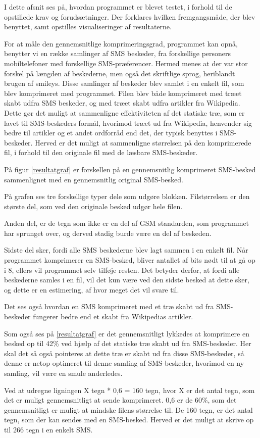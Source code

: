I dette afsnit ses på, hvordan programmet er blevet testet, i forhold til de opstillede krav og 
forudsætninger. Der forklares hvilken fremgangsmåde, der blev benyttet, samt opstilles visualiseringer af 
resultaterne.

For at måle den gennemsnitlige komprimeringsgrad, programmet kan opnå, benytter vi en række samlinger 
af SMS beskeder, fra forskellige personers mobiltelefoner med forskellige SMS-præferencer. Hermed menes at der 
var stor forskel på længden af beskederne, men også det skriftlige sprog, heriblandt brugen af 
smileys.
Disse samlinger af beskeder blev samlet i en enkelt fil, som blev komprimeret med programmet.
Filen blev både komprimeret med træet skabt udfra SMS beskeder, og med træet skabt udfra 
artikler fra Wikipedia. Dette gør det muligt at sammenligne effektiviteten af det statiske træ, som 
er lavet til SMS-beskeders formål, hvorimod træet ud fra Wikipedia, henvender sig bedre til artikler og et 
andet ordforråd end det, der typisk benyttes i SMS-beskeder.
Herved er det muligt at sammenligne størrelsen på den komprimerede fil, i forhold til den originale fil 
med de læsbare SMS-beskeder.

På figur \ref{resultatgraf} er forskellen på en gennemsnitlig komprimeret SMS-besked sammenlignet med en 
gennemsnitlig original SMS-besked.

På grafen ses tre forskellige typer dele som udgøre blokken. Filstørrelsen er den største del, som ved den 
originale besked udgør hele filen.

Anden del, er de tegn som ikke er en del af GSM standarden, som programmet har sprunget over, og derved 
stadig burde være en del af beskeden.

Sidste del sker, fordi alle SMS beskederne blev lagt sammen i en enkelt fil. Når programmet komprimerer en SMS-besked, bliver 
antallet af bits nødt til at gå op i 8, ellers vil programmet selv tilføje resten. Det betyder derfor, at 
fordi alle beskederne samles i en fil, vil det kun være ved den sidste besked at dette sker, og dette er 
en estimering, af hvor meget det vil svare til.

Det ses også hvordan en SMS komprimeret med et træ skabt ud fra SMS-beskeder fungerer bedre end et skabt 
fra Wikipedias artikler.



Som også ses på \ref{resultatgraf} er det gennemsnitligt lykkedes at komprimere en besked op til 42\% ved 
hjælp af det statiske træ skabt ud fra SMS-beskeder.
Her skal det så også pointeres at dette træ er skabt ud fra disse SMS-beskeder, så denne er netop optimeret 
til denne samling af SMS-beskeder, hvorimod en ny samling, vil være en smule anderledes.

Ved at udregne ligningen X tegn * 0,6 = 160 tegn, hvor X er det antal tegn, som det er muligt 
gennemsnitligt at sende komprimeret. 0,6 er de 60\%, som det gennemsnitligt er muligt at mindske filens 
størrelse til. De 160 tegn, er det antal tegn, som der kan sendes med en SMS-besked.
Herved er det muligt at skrive op til 266 tegn i en enkelt SMS.
